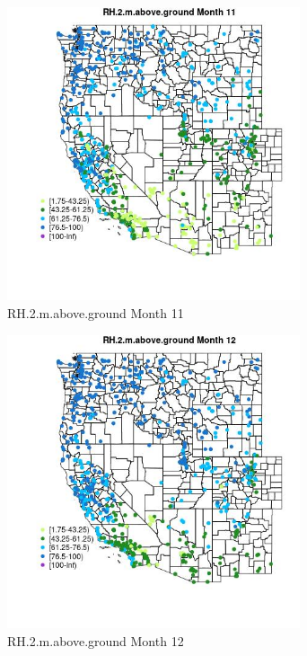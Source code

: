 \begin{figure} 
\centering  
\includegraphics[width=0.77\textwidth]{Code_Outputs/Report_ML_input_PM25_Step4_part_f_de_duplicated_aves_prioritize_24hr_obswNAs_MapObsMo11RH2maboveground.jpg} 
\caption{\label{fig:Report_ML_input_PM25_Step4_part_f_de_duplicated_aves_prioritize_24hr_obswNAsMapObsMo11RH2maboveground}RH.2.m.above.ground Month 11} 
\end{figure} 
 

\begin{figure} 
\centering  
\includegraphics[width=0.77\textwidth]{Code_Outputs/Report_ML_input_PM25_Step4_part_f_de_duplicated_aves_prioritize_24hr_obswNAs_MapObsMo12RH2maboveground.jpg} 
\caption{\label{fig:Report_ML_input_PM25_Step4_part_f_de_duplicated_aves_prioritize_24hr_obswNAsMapObsMo12RH2maboveground}RH.2.m.above.ground Month 12} 
\end{figure} 
 


